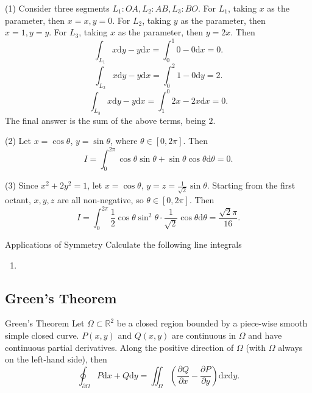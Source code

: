 \begin{solution}
  (1) Consider three segments $L_1: OA, L_2:AB, L_3:BO$.
  For $L_1$, taking $x$ as the parameter, then $x = x, y = 0$.
  For $L_2$, taking $y$ as the parameter, then $x = 1, y = y$.
  For $L_3$, taking $x$ as the parameter, then $y = 2x$.
  Then
  \begin{equation}
    \int_{L_1} x\mathrm{d} y - y\mathrm{d} x = \int_0^1 0 - 0\mathrm{d}x = 0.
  \end{equation}
  \begin{equation}
    \int_{L_2} x\mathrm{d} y - y\mathrm{d} x = \int_0^2 1 - 0 \mathrm{d}y = 2.
  \end{equation}
  \begin{equation}
    \int_{L_3} x\mathrm{d} y - y\mathrm{d} x = \int_1^0 2x - 2x\mathrm{d} x = 0.
  \end{equation}
  The final answer is the sum of the above terms, being $2$.

  (2) Let $x = \cos \theta$, $y = \sin \theta$, where $\theta \in [0, 2\pi]$.
  Then
  \begin{equation}
    I = \int_0^{2\pi} \cos \theta \sin \theta + \sin \theta \cos \theta \mathrm{d} \theta = 0.
  \end{equation}

  (3) Since $x^2 + 2y^2 = 1$, let $x = \cos \theta$, $y = z =
  \frac{1}{\sqrt{2}}\sin \theta$.
  Starting from the first octant, $x, y, z$ are all non-negative, so $\theta \in
  [0, 2\pi]$. Then
  \begin{equation}
    I = \int_0^{2\pi} \frac{1}{2} \cos \theta \sin^2 \theta \cdot \frac{1}{\sqrt{2}} \cos \theta \mathrm{d} \theta =
    \frac{\sqrt{2}\pi}{16}.
  \end{equation}
\end{solution}

\begin{example}{Applications of Symmetry}{}
  Calculate the following line integrals
  \begin{enumerate}
  \item 
  \end{enumerate}
\end{example}

\subsection{Green's Theorem}

\begin{theorem}{Green's Theorem}{}
  Let $\Omega \subset \mathbb{R}^2$ be a closed region bounded by a piece-wise
  smooth simple closed curve.
  $P(x,y)$ and $Q(x,y)$ are continuous in $\Omega$ and have continuous partial derivatives.
  Along the positive direction of $\Omega$ (with $\Omega$ always on the
  left-hand side), then
  \begin{equation}
    \oint_{\partial \Omega} P \mathrm{d} x + Q \mathrm{d} y
    = \iint_{\Omega} \left( \frac{\partial Q}{\partial x} - \frac{\partial P}{\partial y} \right) \mathrm{d} x \mathrm{d}y.
  \end{equation}
\end{theorem}

